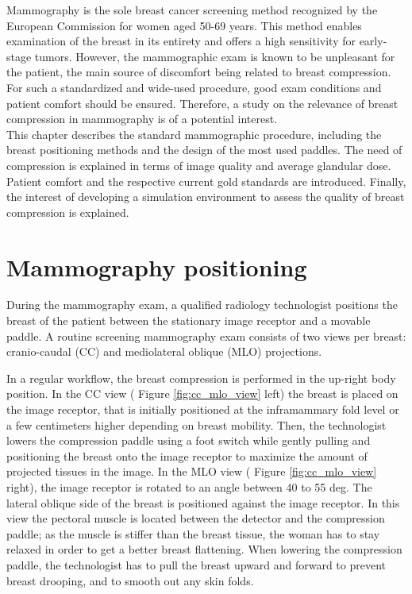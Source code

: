 

Mammography is the sole breast cancer screening method recognized by the European Commission for women aged 50-69 years. This method enables examination of the breast in its entirety and offers a high sensitivity for early-stage tumors. However, the mammographic exam is known to be unpleasant for the patient, the main source of discomfort being related to breast compression.  For such a standardized and wide-used procedure, good exam conditions and patient comfort should be ensured. Therefore, a study on the relevance of breast compression in mammography is of a potential interest.\\



 This chapter describes the standard mammographic procedure, including the breast positioning methods and the design of the most used paddles. The need of compression is explained in terms of image quality and average glandular dose. Patient comfort and the respective current gold standards are introduced. Finally, the interest of developing a simulation environment to assess the quality of breast compression is explained.

\clearpage
\section{Mammography positioning} \label{subsec:mammographicpositioning}

During the mammography exam, a qualified radiology technologist positions the breast of the patient between the stationary image receptor and a movable paddle. A routine screening mammography exam consists of two views per breast: cranio-caudal (CC) and mediolateral oblique (MLO) projections.  

In a regular workflow, the breast compression is performed in the up-right body position. In the CC view ( Figure \ref{fig:cc_mlo_view} left) the breast is placed on the image receptor, that is initially positioned at the inframammary fold level or a few centimeters higher depending on breast mobility. Then, the technologist lowers the compression paddle using a foot switch while gently pulling and positioning the breast onto the image receptor to maximize the amount of projected tissues in the image. In the MLO view ( Figure  \ref{fig:cc_mlo_view} right), the image receptor is rotated to an angle between 40 to 55 deg. The lateral oblique side of the breast is positioned against the image receptor. In this view the pectoral muscle is located between the detector and the compression paddle; as the muscle is stiffer than the breast tissue, the woman has to stay relaxed in order to get a better breast flattening. When lowering the compression paddle, the technologist has to pull the breast upward and forward to prevent breast drooping, and to smooth out any skin folds. 


